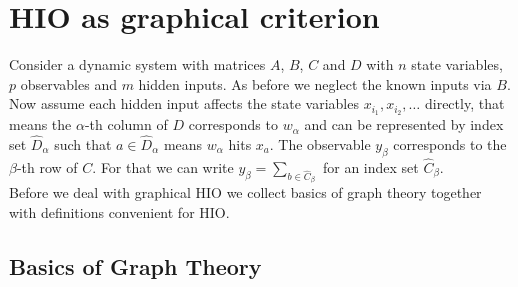 \section{HIO as graphical criterion}

Consider a dynamic system with matrices $A$, $B$, $C$ and $D$ with $n$ state variables, 
$p$ observables and $m$ hidden inputs. As before we neglect the known inputs via $B$. 
Now assume each hidden input affects the state variables $x_{i_1},x_{i_2},\ldots$ 
directly, that means the 
$\alpha$-th column of $D$ corresponds to $w_\alpha$ and can be represented by index set 
$\hat{D}_\alpha$ such that $a\in \hat{D}_\alpha$ means $w_\alpha$ hits $x_a$. 
The observable $y_\beta$ corresponds to the $\beta$-th row of $C$. For that we can write 
$y_\beta = \sum_{b\in\hat{C}_\beta}$ for an index set $\hat{C}_\beta$. \\

Before we deal with graphical HIO we collect basics of graph theory together with 
definitions convenient for HIO.

\subsection{Basics of Graph Theory}

